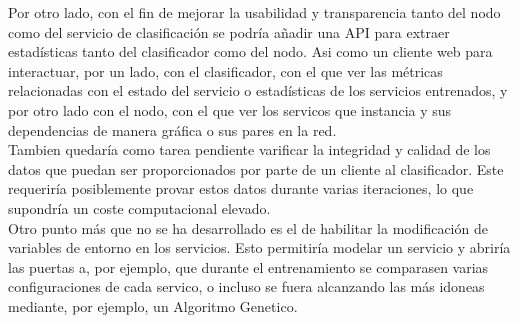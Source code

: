 \documentclass[11pt]{article}
\begin{document}
		Por otro lado, con el fin de mejorar la usabilidad y transparencia tanto del nodo como del servicio de clasificación se podría añadir una 
		API para extraer estadísticas tanto del clasificador como del nodo. Asi como un cliente web para interactuar, por un lado, con el clasificador, con el
		que ver las métricas relacionadas con el estado del servicio o estadísticas de los servicios entrenados, y por otro lado con el nodo, con el que ver
		los servicos que instancia y sus dependencias de manera gráfica o sus pares en la red. \\

		Tambien quedaría como tarea pendiente varificar la integridad y calidad de los datos que puedan ser proporcionados por parte de un cliente al clasificador. 
		Este requeriría posiblemente provar estos datos durante varias iteraciones, lo que supondría un coste computacional elevado. \\
		
		Otro punto más que no se ha desarrollado es el de habilitar la modificación de variables de entorno en los servicios. Esto permitiría modelar un servicio y abriría las puertas a,
		por ejemplo, que durante el entrenamiento se comparasen varias configuraciones de cada servico, o incluso se fuera alcanzando las más idoneas mediante, por ejemplo, un Algoritmo Genetico.\\

	
	
	\nocite{*}
\end{document}
